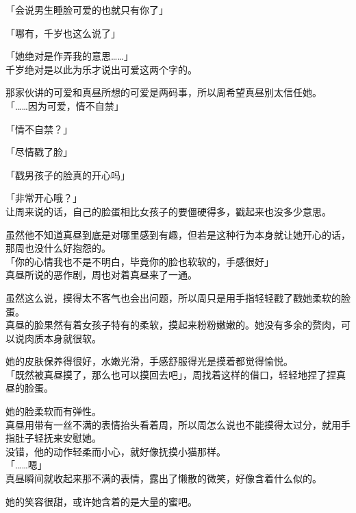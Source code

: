 「会说男生睡脸可爱的也就只有你了」

「哪有，千岁也这么说了」

「她绝对是作弄我的意思……」\\

千岁绝对是以此为乐才说出可爱这两个字的。

那家伙讲的可爱和真昼所想的可爱是两码事，所以周希望真昼别太信任她。\\

「……因为可爱，情不自禁」

「情不自禁？」

「尽情戳了脸」

「戳男孩子的脸真的开心吗」

「非常开心哦？」\\

让周来说的话，自己的脸蛋相比女孩子的要僵硬得多，戳起来也没多少意思。

虽然他不知道真昼到底是对哪里感到有趣，但若是这种行为本身就让她开心的话，那周也没什么好抱怨的。\\

「你的心情我也不是不明白，毕竟你的脸也软软的，手感很好」\\

真昼所说的恶作剧，周也对着真昼来了一通。

虽然这么说，摸得太不客气也会出问题，所以周只是用手指轻轻戳了戳她柔软的脸蛋。\\

真昼的脸果然有着女孩子特有的柔软，摸起来粉粉嫩嫩的。她没有多余的赘肉，可以说肉质本身就很软。

她的皮肤保养得很好，水嫩光滑，手感舒服得光是摸着都觉得愉悦。\\

「既然被真昼摸了，那么也可以摸回去吧」，周找着这样的借口，轻轻地捏了捏真昼的脸蛋。

她的脸柔软而有弹性。\\

真昼用带有一丝不满的表情抬头看着周，所以周怎么说也不能摸得太过分，就用手指肚子轻抚来安慰她。\\

没错，他的动作轻柔而小心，就好像抚摸小猫那样。\\

「……嗯」\\

真昼瞬间就收起来那不满的表情，露出了懒散的微笑，好像含着什么似的。

她的笑容很甜，或许她含着的是大量的蜜吧。\\

